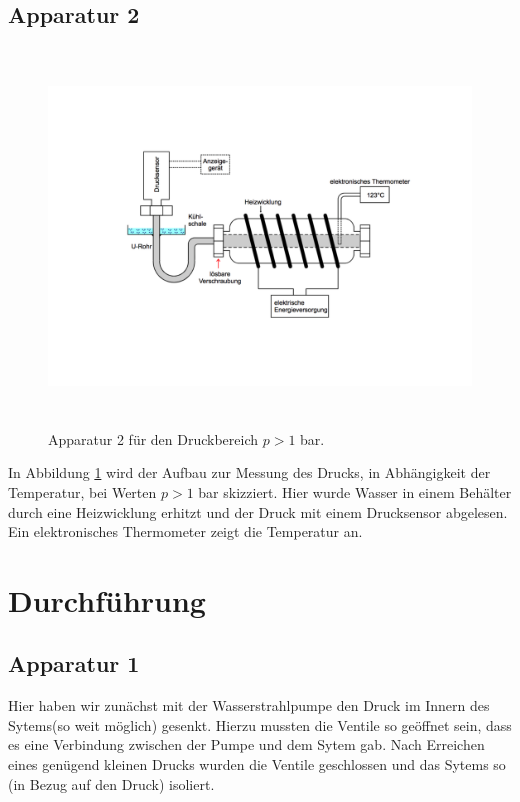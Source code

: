 \newpage

\subsection{Apparatur 2}

  \begin{figure}[h!]
    \centering
    \includegraphics[height = 10cm]{Apparatur2.pdf}
    \caption{Apparatur 2 für den Druckbereich $p > 1$ \si{bar}.}
    \label{fig: Apparatur2}
  \end{figure}

\FloatBarrier

In Abbildung \ref{fig: Apparatur2} wird der Aufbau zur Messung des Drucks, in Abhängigkeit der
Temperatur, bei Werten $p > 1$ \si{bar} skizziert. Hier wurde Wasser in einem Behälter durch eine
Heizwicklung erhitzt und der Druck mit einem Drucksensor abgelesen. Ein elektronisches Thermometer
zeigt die Temperatur an.

\newpage

\section{Durchführung}
\label{sec:Durchführung}

\subsection{Apparatur 1}

Hier haben wir zunächst mit der Wasserstrahlpumpe den Druck im Innern des Sytems(so weit möglich)
gesenkt. Hierzu mussten die Ventile so geöffnet sein, dass es eine Verbindung zwischen der Pumpe
und dem Sytem gab. Nach Erreichen eines genügend kleinen Drucks wurden die Ventile geschlossen und
das Sytems so (in Bezug auf den Druck) isoliert.

